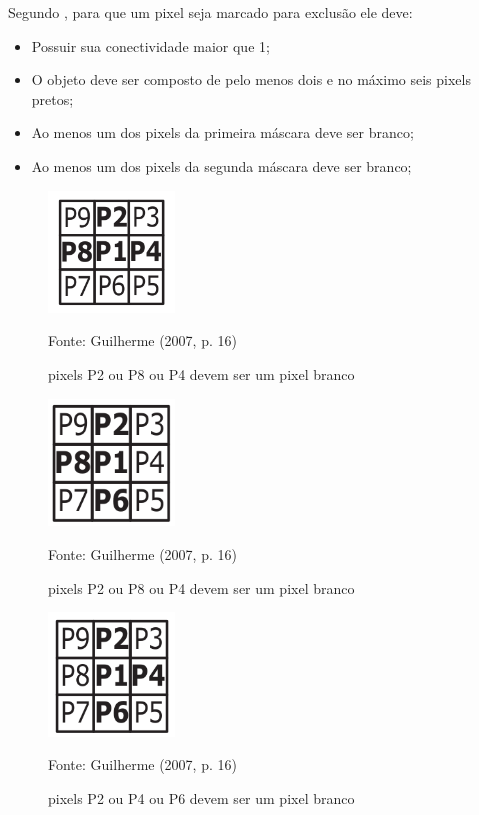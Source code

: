 \documentclass[
	12pt,				%
	oneside,			%
	a4paper,			%
	english,			%
	french,				%
	spanish,			%
	brazil,				%
	]{abntex2}
\begin{document}
Segundo \citet{guilherme:2007}, para que um pixel seja marcado para exclusão ele deve:

\begin{itemize}
\item Possuir sua conectividade maior que 1;
\item O objeto deve ser composto de pelo menos dois e no máximo seis pixels pretos;
\item Ao menos um dos pixels da primeira máscara deve ser branco;
\item Ao menos um dos pixels da segunda máscara deve ser branco;
\end{itemize}


\begin{figure}[ht]
\centering
\caption{pixels P2 ou P8 ou P4 devem ser um pixel branco}
\includegraphics[width=0.3\textwidth]{imagens/zhangsuen1.png}

Fonte: Guilherme (2007, p. 16)
\label{fig:zhangsuen1}
\end{figure}


\begin{figure}[ht]
\centering
\caption{pixels P2 ou P8 ou P4 devem ser um pixel branco}
\includegraphics[width=0.3\textwidth]{imagens/zhangsuen2.png}

Fonte: Guilherme (2007, p. 16)
\label{fig:zhangsuen2}
\end{figure}

\begin{figure}[ht]
\centering
\caption{pixels P2 ou P4 ou P6 devem ser um pixel branco}
\includegraphics[width=0.3\textwidth]{imagens/zhangsuen3.png}

Fonte: Guilherme (2007, p. 16)
\label{fig:zhangsuen3}
\end{figure}
\end{document}
